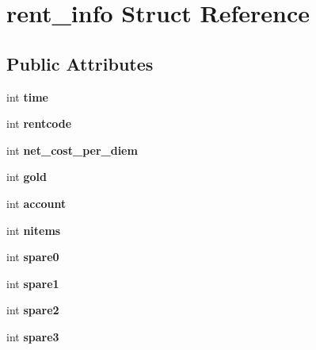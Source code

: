 \hypertarget{structrent__info}{}\section{rent\+\_\+info Struct Reference}
\label{structrent__info}
\subsection*{Public Attributes}
\begin{DoxyCompactItemize}
\item 
\mbox{\label{structrent__info_abf96b71e4389749f644ad073458f4b1b}} 
int {\bfseries time}
\item 
\mbox{\label{structrent__info_aa21e9458d2e0831640e3cea47b61ab3b}} 
int {\bfseries rentcode}
\item 
\mbox{\label{structrent__info_a3aa1680d703ab8e46596c94bc7295e58}} 
int {\bfseries net\+\_\+cost\+\_\+per\+\_\+diem}
\item 
\mbox{\label{structrent__info_a6af6434963e42a474e8b39df28649f05}} 
int {\bfseries gold}
\item 
\mbox{\label{structrent__info_a3ff493c3a6d982337472ae2ddd35c184}} 
int {\bfseries account}
\item 
\mbox{\label{structrent__info_a0808d445f918ecbc789caf7ea44b1926}} 
int {\bfseries nitems}
\item 
\mbox{\label{structrent__info_aabe8207f3042ee4398bd63a82bd1bd81}} 
int {\bfseries spare0}
\item 
\mbox{\label{structrent__info_abed190a80a80ad515ced5f6f6fa83145}} 
int {\bfseries spare1}
\item 
\mbox{\label{structrent__info_a1e7e6508d65705626f041e71626210bc}} 
int {\bfseries spare2}
\item 
\mbox{\label{structrent__info_acffe7882cf98a7e5b597f8d66ce5487c}} 
int {\bfseries spare3}
\item 

\end{DoxyCompactItemize}
